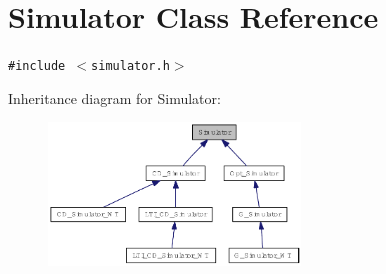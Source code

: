 \hypertarget{class_simulator}{
\section{Simulator Class Reference}
\label{class_simulator}
}
{\tt \#include $<$simulator.h$>$}

Inheritance diagram for Simulator:\nopagebreak
\begin{figure}[H]
\begin{center}
\leavevmode
\includegraphics[width=190pt]{class_simulator__inherit__graph}
\end{center}
\end{figure}
